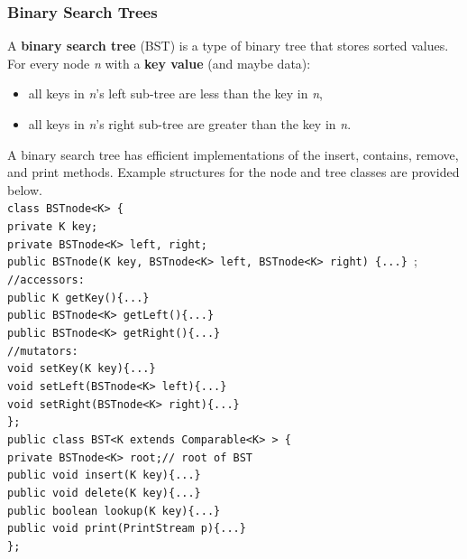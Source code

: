 \subsubsection{Binary Search Trees}

A \textbf{binary search tree} (BST) is a type of binary tree that stores sorted values. For every node \textit{n} with a \textbf{key value} (and maybe data):

\begin{itemize}
	\item all keys in \textit{n}'s left sub-tree are less than the key in \textit{n},
	\item all keys in \textit{n}'s right sub-tree are greater than the key in \textit{n}.
\end{itemize}

A binary search tree has efficient implementations of the insert, contains, remove, and print methods. Example structures for the node and tree classes are provided below. \\

\texttt{class BSTnode<K> \{} \\
\indent \indent \texttt{private K key;} \\
\indent \indent \texttt{private BSTnode<K> left, right;} \\
\indent \indent \texttt{public BSTnode(K key, BSTnode<K> left, BSTnode<K> right) \{...\} }; \\
\indent \indent \texttt{//accessors:} \\
\indent \indent \texttt{public K getKey()\{...\}} \\
\indent \indent \texttt{public BSTnode<K> getLeft()\{...\}} \\
\indent \indent \texttt{public BSTnode<K> getRight()\{...\}} \\
\indent \indent \texttt{//mutators:} \\
\indent \indent \texttt{void setKey(K key)\{...\}} \\
\indent \indent \texttt{void setLeft(BSTnode<K> left)\{...\}} \\
\indent \indent \texttt{void setRight(BSTnode<K> right)\{...\}} \\
\indent \texttt{\};} \\

\texttt{public class BST<K extends Comparable<K> > \{} \\
\indent \indent \texttt{private BSTnode<K> root;// root of BST} \\
\indent \indent \texttt{public void insert(K key)\{...\}} \\
\indent \indent \texttt{public void delete(K key)\{...\}} \\
\indent \indent \texttt{public boolean lookup(K key)\{...\}} \\
\indent \indent \texttt{public void print(PrintStream p)\{...\}} \\
\indent \texttt{\};} \\

